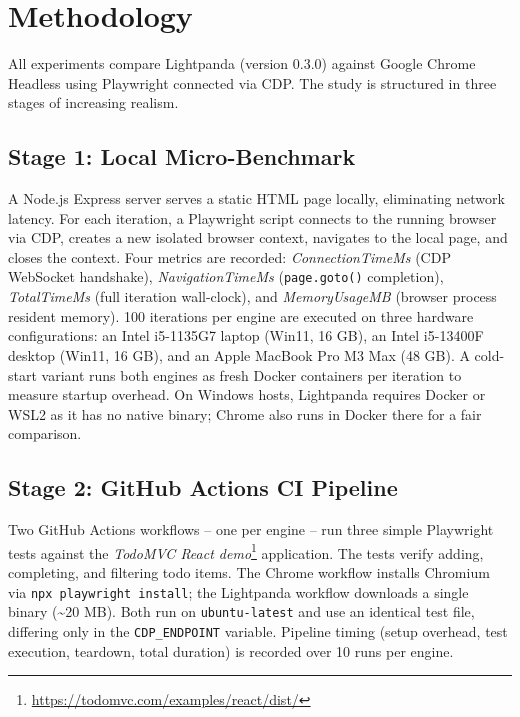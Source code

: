 \section{Methodology}
\label{sec:methodology}

All experiments compare Lightpanda (version 0.3.0) against Google Chrome Headless using Playwright connected via CDP. The study is structured in three stages of increasing realism.

\subsection{Stage 1: Local Micro-Benchmark}

A Node.js Express server serves a static HTML page locally, eliminating network latency. For each iteration, a Playwright script connects to the running browser via CDP, creates a new isolated browser context, navigates to the local page, and closes the context. Four metrics are recorded: \emph{ConnectionTimeMs} (CDP WebSocket handshake), \emph{NavigationTimeMs} (\texttt{page.goto()} completion), \emph{TotalTimeMs} (full iteration wall-clock), and \emph{MemoryUsageMB} (browser process resident memory). 100 iterations per engine are executed on three hardware configurations: an Intel i5-1135G7 laptop (Win11, 16 GB), an Intel i5-13400F desktop (Win11, 16 GB), and an Apple MacBook Pro M3 Max (48 GB). A cold-start variant runs both engines as fresh Docker containers per iteration to measure startup overhead. On Windows hosts, Lightpanda requires Docker or WSL2 as it has no native binary; Chrome also runs in Docker there for a fair comparison.

\subsection{Stage 2: GitHub Actions CI Pipeline}

Two GitHub Actions workflows -- one per engine -- run three simple Playwright tests against the \textit{TodoMVC React demo}\footnote{\url{https://todomvc.com/examples/react/dist/}} application. The tests verify adding, completing, and filtering todo items. The Chrome workflow installs Chromium via \texttt{npx playwright install}; the Lightpanda workflow downloads a single binary (\textasciitilde20 MB). Both run on \texttt{ubuntu-latest} and use an identical test file, differing only in the \texttt{CDP\_ENDPOINT} variable. Pipeline timing (setup overhead, test execution, teardown, total duration) is recorded over 10 runs per engine.

